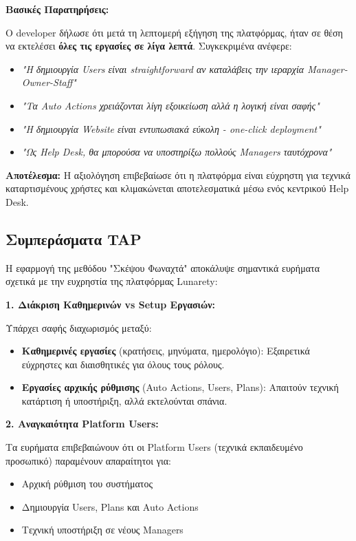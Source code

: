 \documentclass[
	12pt, %
	oneside, %
	greek,
	onehalfspacing, %
	liststotoc, %
	toctotoc, %
	parskip, %
	headsepline, %
]{MastersDoctoralThesis} %
\begin{document}
\textbf{Βασικές Παρατηρήσεις:}

Ο developer δήλωσε ότι μετά τη λεπτομερή εξήγηση της πλατφόρμας, ήταν σε θέση να εκτελέσει \textbf{όλες τις εργασίες σε λίγα λεπτά}. Συγκεκριμένα ανέφερε:
\begin{itemize}
    \item \textit{"Η δημιουργία Users είναι straightforward αν καταλάβεις την ιεραρχία Manager-Owner-Staff"}
    \item \textit{"Τα Auto Actions χρειάζονται λίγη εξοικείωση αλλά η λογική είναι σαφής"}
    \item \textit{"Η δημιουργία Website είναι εντυπωσιακά εύκολη - one-click deployment"}
    \item \textit{"Ως Help Desk, θα μπορούσα να υποστηρίξω πολλούς Managers ταυτόχρονα"}
\end{itemize}

\textbf{Αποτέλεσμα:} Η αξιολόγηση επιβεβαίωσε ότι η πλατφόρμα είναι εύχρηστη για τεχνικά καταρτισμένους χρήστες και κλιμακώνεται αποτελεσματικά μέσω ενός κεντρικού Help Desk.

\subsection{Συμπεράσματα TAP}

Η εφαρμογή της μεθόδου "Σκέψου Φωναχτά" αποκάλυψε σημαντικά ευρήματα σχετικά με την ευχρηστία της πλατφόρμας Lunarety:

\textbf{1. Διάκριση Καθημερινών vs Setup Εργασιών:}

Υπάρχει σαφής διαχωρισμός μεταξύ:
\begin{itemize}
    \item \textbf{Καθημερινές εργασίες} (κρατήσεις, μηνύματα, ημερολόγιο): Εξαιρετικά εύχρηστες και διαισθητικές για όλους τους ρόλους.
    \item \textbf{Εργασίες αρχικής ρύθμισης} (Auto Actions, Users, Plans): Απαιτούν τεχνική κατάρτιση ή υποστήριξη, αλλά εκτελούνται σπάνια.
\end{itemize}

\textbf{2. Αναγκαιότητα Platform Users:}

Τα ευρήματα επιβεβαιώνουν ότι οι Platform Users (τεχνικά εκπαιδευμένο προσωπικό) παραμένουν απαραίτητοι για:
\begin{itemize}
    \item Αρχική ρύθμιση του συστήματος
    \item Δημιουργία Users, Plans και Auto Actions
    \item Τεχνική υποστήριξη σε νέους Managers
\end{itemize}
\end{document}
